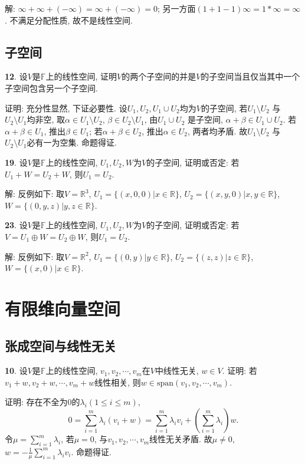 \documentclass[12pt,a4paper]{article}
\begin{document}
\begin{CJK*}{GBK}{song}
\par 解: $\infty+\infty+(-\infty)=\infty+(-\infty)=0$; 另一方面$(1+1-1)\infty=1*\infty=\infty$. 不满足分配性质, 故不是线性空间.

\subsection{子空间}

\par \textbf{12}. 设$V$是$\mathbb{F}$上的线性空间, 证明$V$的两个子空间的并是$V$的子空间当且仅当其中一个子空间包含另一个子空间.
\par 证明: 充分性显然, 下证必要性. 设$U_1,U_2, U_1 \cup U_2$均为$V$的子空间, 若$U_1\setminus U_2$ 与$U_2\setminus U_1$均非空, 取$\alpha \in U_1\setminus U_2$, $\beta \in U_2\setminus U_1$, 由$U_1 \cup U_2$ 是子空间, $\alpha+\beta \in U_1 \cup U_2$. 若$\alpha+\beta \in U_1$, 推出$\beta \in U_1$; 若$\alpha+\beta \in U_2$, 推出$\alpha \in U_2$, 两者均矛盾. 故$U_1\setminus U_2$ 与$U_2\setminus U_1$必有一为空集. 命题得证.

\par \textbf{19}. 设$V$是$\mathbb{F}$上的线性空间, $U_1,U_2,W$为$V$的子空间, 证明或否定: 若$U_1+W=U_2+W$, 则$U_1=U_2$.
\par 解: 反例如下: 取$V=\mathbb{R}^3$, $U_1=\{(x,0,0)|x\in \mathbb{R}\}$, $U_2=\{(x,y,0)|x,y\in \mathbb{R}\}$, $W=\{(0,y,z)|y,z\in \mathbb{R}\}$.

\par \textbf{23}. 设$V$是$\mathbb{F}$上的线性空间, $U_1,U_2,W$为$V$的子空间, 证明或否定: 若$V=U_1\oplus W=U_2\oplus W$, 则$U_1=U_2$.
\par 解: 反例如下: 取$V=\mathbb{R}^2$, $U_1=\{(0,y)|y\in \mathbb{R}\}$, $U_2=\{(z,z)|z\in \mathbb{R}\}$, $W=\{(x,0)|x\in \mathbb{R}\}$.

\section{有限维向量空间}

\subsection{张成空间与线性无关}

\par \textbf{10}. 设$V$是$\mathbb{F}$上的线性空间, $v_1,v_2,\cdots,v_m$在$V$中线性无关, $w\in V$. 证明: 若$v_1+w,v_2+w,\cdots,v_m+w$线性相关, 则$w \in \text{span}(v_1,v_2,\cdots,v_m)$.
\par 证明: 存在不全为0的$\lambda_i (1\le i\le m)$,
\begin{displaymath}
0=\sum_{i=1}^m \lambda_i(v_i+w)=\sum_{i=1}^m \lambda_i v_i+ (\sum_{i=1}^m \lambda_i)w.
\end{displaymath}
令$\mu=\sum_{i=1}^m \lambda_i$, 若$\mu=0$, 与$v_1,v_2,\cdots,v_m$线性无关矛盾. 故$\mu\neq 0$, $w=-\frac{1}{\mu}\sum_{i=1}^m \lambda_i v_i$. 命题得证.


\end{CJK*}
\end{document}
